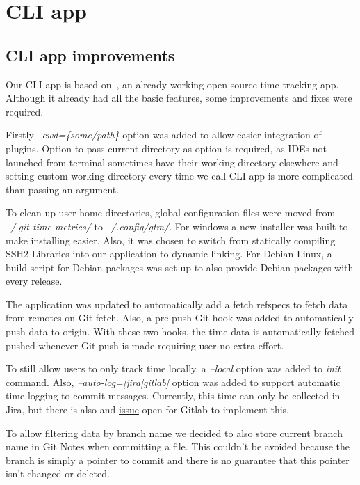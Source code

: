 \section{CLI app}\label{sec:cli-app-contents}

\subsection{CLI app improvements}\label{subsec:cli-app-improvements}
Our CLI app is based on~, an already working open source time tracking app.
Although it already had all the basic features, some improvements and fixes were required.

Firstly \textit{--cwd=\{some/path\}} option was added to allow easier integration of plugins.
Option to pass current directory as option is required, as IDEs not launched from terminal sometimes have their working
directory elsewhere and setting custom working directory every time we call CLI app is more complicated than passing an argument.

To clean up user home directories, global configuration files were moved from \textit{~/.git-time-metrics/} to \textit{~/.config/gtm/}.
For windows a new installer was built to make installing easier.
Also, it was chosen to switch from statically compiling SSH2 Libraries into our application to dynamic linking.
For Debian Linux, a build script for Debian packages was set up to also provide Debian packages with every release.

The application was updated to automatically add a fetch refspecs to fetch data from remotes on Git fetch.
Also, a pre-push Git hook was added to automatically push data to origin.
With these two hooks, the time data is automatically fetched pushed whenever Git push is made requiring user no extra effort.

To still allow users to only track time locally, a \textit{--local} option was added to \textit{init} command.
Also, \textit{--auto-log=[jira|gitlab]} option was added to support automatic time logging to commit messages.
Currently, this time can only be collected in Jira, but there is also and \href{https://gitlab.com/gitlab-org/gitlab/-/issues/16543}{issue}
open for Gitlab to implement this.\cite{gitlab-time-issue}

To allow filtering data by branch name we decided to also store current branch name in Git Notes when committing a file.
This couldn't be avoided because the branch is simply a pointer to commit and there is no guarantee that this pointer isn't changed or deleted.

